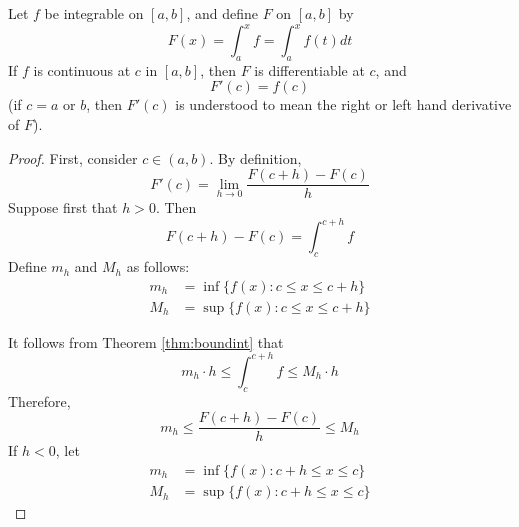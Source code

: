 \documentclass[12pt, a4paper, oneside, openright, titlepage]{book}
\begin{document}
\begin{namthm}\label{thmname:FTC}
    Let $f$ be integrable on $[a,b]$, and define $F$ on $[a,b]$ by \begin{equation}
        F(x) = \int_a^xf = \int_a^xf(t)dt
    \end{equation}
    If $f$ is continuous at $c$ in $[a,b]$, then $F$ is differentiable at $c$, and \begin{equation}
        F'(c) = f(c)
    \end{equation}
    (if $c = a$ or $b$, then $F'(c)$ is understood to mean the right or left hand derivative of $F$).
\end{namthm}
\begin{proof}
    First, consider $c \in (a,b)$. By definition,\begin{equation*}
        F'(c) = \lim\limits_{h\rightarrow 0}\frac{F(c+h)-F(c)}{h}
    \end{equation*}
    Suppose first that $h > 0$. Then \begin{equation*}
        F(c+h) - F(c) = \int_c^{c+h}f
    \end{equation*}
    Define $m_h$ and $M_h$ as follows:\begin{align*}
        m_h &= \inf\{f(x):c\leq x \leq c+h\} \\
        M_h &= \sup\{f(x):c\leq x \leq c+h\}
    \end{align*}

    It follows from Theorem \ref{thm:boundint} that \begin{equation*}
        m_h\cdot h\leq \int_c^{c+h}f \leq M_h\cdot h
    \end{equation*}
    Therefore, \begin{equation*}
        m_h\leq \frac{F(c+h) - F(c)}{h} \leq M_h
    \end{equation*}
    If $h < 0$, let \begin{align*}
        m_h &= \inf\{f(x):c+h\leq x \leq c\} \\
        M_h &= \sup\{f(x):c+h\leq x \leq c\}
    \end{align*}


\end{proof}
\end{document}
